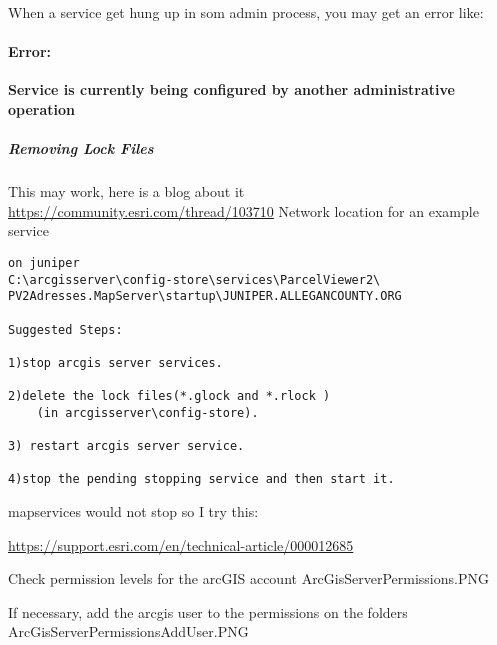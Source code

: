 \noindent When a service get hung up in som admin process, you may get an error like:
\paragraph*{Error: \texorpdfstring{\\}{}}
\noindent \textbf{Service is currently being configured by another administrative operation}
\subparagraph[Remove Lock Files]{Removing Lock Files \texorpdfstring{\\}{}}
This may work, here is a blog about it\\
\href{https://community.esri.com/thread/103710}{https://community.esri.com/thread/103710}
Network location for an example service\\
\begin{verbatim}
on juniper
C:\arcgisserver\config-store\services\ParcelViewer2\
PV2Adresses.MapServer\startup\JUNIPER.ALLEGANCOUNTY.ORG

Suggested Steps:

1)stop arcgis server services.

2)delete the lock files(*.glock and *.rlock )
    (in arcgisserver\config-store).

3) restart arcgis server service.

4)stop the pending stopping service and then start it.
\end{verbatim}


mapservices would not stop so I try this:


\href{https://support.esri.com/en/technical-article/000012685}{https://support.esri.com/en/technical-article/000012685}


Check permission levels for the arcGIS account
ArcGisServerPermissions.PNG


If necessary, add the arcgis user to the permissions on the folders
ArcGisServerPermissionsAddUser.PNG



